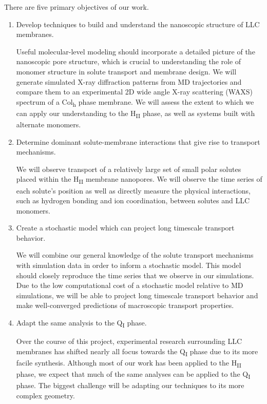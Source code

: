 \documentclass{article}
\begin{document}
  \noindent There are five primary objectives of our work.
  \begin{enumerate}
  
    \item Develop techniques to build and understand the nanoscopic structure
    of LLC membranes.
    
    Useful molecular-level modeling should incorporate a detailed picture 
    of the nanoscopic pore structure, which is crucial to understanding
    the role of monomer structure in solute transport and membrane design.
    We will generate simulated X-ray diffraction patterns from MD trajectories
    and compare them to an experimental 2D wide angle X-ray scattering (WAXS)
    spectrum of a Col\textsubscript{h} phase membrane. We will assess the extent
    to which we can apply our understanding to the H\textsubscript{II} phase,
    as well as systems built with alternate monomers.
    
    \item Determine dominant solute-membrane interactions that give rise to
    transport mechanisms.
    
    We will observe transport of a relatively large set of small polar solutes
    placed within the H\textsubscript{II} membrane nanopores. We will observe
    the time series of each solute's position as well as directly measure the
    physical interactions, such as hydrogen bonding and ion coordination, 
    between solutes and LLC monomers.
    
    \item Create a stochastic model which can project long timescale 
    transport behavior.
    
    We will combine our general knowledge of the solute transport mechanisms
    with simulation data in order to inform a stochastic model. This model
    should closely reproduce the time series that we observe in our simulations.
    Due to the low computational cost of a stochastic model relative to 
    MD simulations, we will be able to project long timescale transport behavior
    and make well-converged predictions of macroscopic transport properties.
           
    \item Adapt the same analysis to the Q\textsubscript{I} phase.
    
    Over the course of this project, experimental research surrounding
    LLC membranes has shifted nearly all focus towards the Q\textsubscript{I}
    phase due to its more facile synthesis.	Although most of our work has 
    been applied to the H\textsubscript{II} phase, we expect that much of 
    the same analyses can be applied to the Q\textsubscript{I} phase. The 
    biggest challenge will be adapting our techniques to its more complex
    geometry.
    

\end{enumerate}
\end{document}
